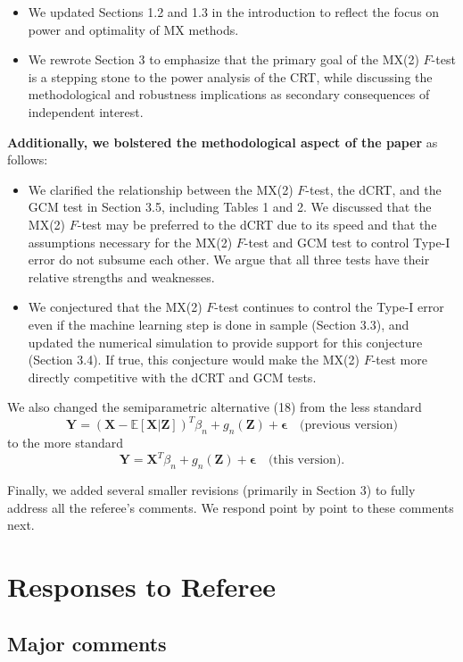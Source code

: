 \documentclass[12pt]{article}
\begin{document}
\begin{itemize}
	\item We updated Sections 1.2 and 1.3 in the introduction to reflect the focus on power and optimality of MX methods.
	\item We rewrote Section 3 to emphasize that the primary goal of the MX(2) $F$-test is a stepping stone to the power analysis of the CRT, while discussing the methodological and robustness implications as secondary consequences of independent interest.
\end{itemize}
\noindent
\textbf{Additionally, we bolstered the methodological aspect of the paper} as follows:
\begin{itemize}
	\item We clarified the relationship between the MX(2) $F$-test, the dCRT, and the GCM test in Section 3.5, including Tables 1 and 2. We discussed that the MX(2) $F$-test may be preferred to the dCRT due to its speed and that the assumptions necessary for the MX(2) $F$-test and GCM test to control Type-I error do not subsume each other. We argue that all three tests have their relative strengths and weaknesses.
	\item We conjectured that the MX(2) $F$-test continues to control the Type-I error even if the machine learning step is done in sample (Section 3.3), and updated the numerical simulation to provide support for this conjecture (Section 3.4). If true, this conjecture would make the MX(2) $F$-test more directly competitive with the dCRT and GCM tests.
\end{itemize}

\noindent We also changed the semiparametric alternative (18) from the less standard $$\bm Y = (\bm X-\mathbb E[\bm X|\bm Z])^T \beta_n + g_n(\bm Z) + \bm \epsilon \quad \text{(previous version)}$$ to the more standard $$\bm Y = \bm X^T \beta_n + g_n(\bm Z) + \bm \epsilon \quad \text{(this version)}.$$ 

\noindent 
Finally, we added several smaller revisions (primarily in Section 3) to fully address all the referee's comments. We respond point by point to these comments next.

\section{Responses to Referee}

\subsection{Major comments}
\end{document}
